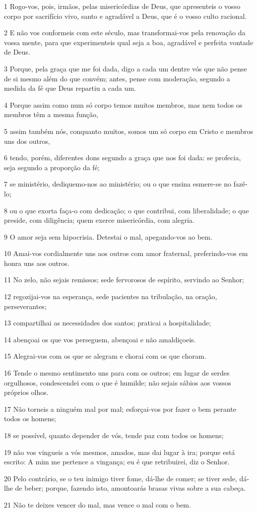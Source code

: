 \par 1 Rogo-vos, pois, irmãos, pelas misericórdias de Deus, que apresenteis o vosso corpo por sacrifício vivo, santo e agradável a Deus, que é o vosso culto racional.
\par 2 E não vos conformeis com este século, mas transformai-vos pela renovação da vossa mente, para que experimenteis qual seja a boa, agradável e perfeita vontade de Deus.
\par 3 Porque, pela graça que me foi dada, digo a cada um dentre vós que não pense de si mesmo além do que convém; antes, pense com moderação, segundo a medida da fé que Deus repartiu a cada um.
\par 4 Porque assim como num só corpo temos muitos membros, mas nem todos os membros têm a mesma função,
\par 5 assim também nós, conquanto muitos, somos um só corpo em Cristo e membros uns dos outros,
\par 6 tendo, porém, diferentes dons segundo a graça que nos foi dada: se profecia, seja segundo a proporção da fé;
\par 7 se ministério, dediquemo-nos ao ministério; ou o que ensina esmere-se no fazê-lo;
\par 8 ou o que exorta faça-o com dedicação; o que contribui, com liberalidade; o que preside, com diligência; quem exerce misericórdia, com alegria.
\par 9 O amor seja sem hipocrisia. Detestai o mal, apegando-vos ao bem.
\par 10 Amai-vos cordialmente uns aos outros com amor fraternal, preferindo-vos em honra uns aos outros.
\par 11 No zelo, não sejais remissos; sede fervorosos de espírito, servindo ao Senhor;
\par 12 regozijai-vos na esperança, sede pacientes na tribulação, na oração, perseverantes;
\par 13 compartilhai as necessidades dos santos; praticai a hospitalidade;
\par 14 abençoai os que vos perseguem, abençoai e não amaldiçoeis.
\par 15 Alegrai-vos com os que se alegram e chorai com os que choram.
\par 16 Tende o mesmo sentimento uns para com os outros; em lugar de serdes orgulhosos, condescendei com o que é humilde; não sejais sábios aos vossos próprios olhos.
\par 17 Não torneis a ninguém mal por mal; esforçai-vos por fazer o bem perante todos os homens;
\par 18 se possível, quanto depender de vós, tende paz com todos os homens;
\par 19 não vos vingueis a vós mesmos, amados, mas dai lugar à ira; porque está escrito: A mim me pertence a vingança; eu é que retribuirei, diz o Senhor.
\par 20 Pelo contrário, se o teu inimigo tiver fome, dá-lhe de comer; se tiver sede, dá-lhe de beber; porque, fazendo isto, amontoarás brasas vivas sobre a sua cabeça.
\par 21 Não te deixes vencer do mal, mas vence o mal com o bem.


